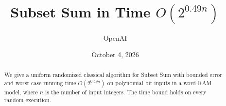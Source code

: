 \documentclass[11pt]{article}
\title{Subset Sum in Time \texorpdfstring{$O(2^{0.49n})$}{O(2\string^\string{0.49n\string})}}
\author{OpenAI}
\date{October 4, 2026}
\theoremstyle{definition}
\theoremstyle{remark}
\numberwithin{equation}{section}
\begin{document}
\maketitle
\begin{abstract}
We give a uniform randomized classical algorithm for Subset Sum with bounded
error and worst-case running time $O(2^{0.49n})$ on polynomial-bit inputs in a
word-RAM model, where $n$ is the number of input integers. The time bound holds
on every random execution.
\end{abstract}







\appendix


\begingroup
\small
\raggedright


\endgroup
\end{document}
